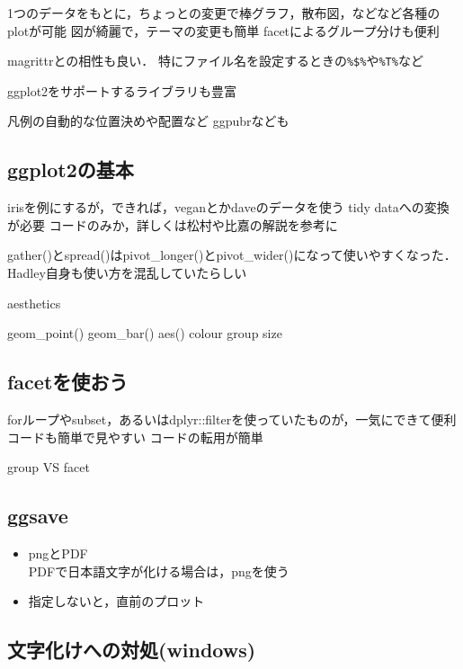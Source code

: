 \documentclass[
]{article}
\begin{document}
1つのデータをもとに，ちょっとの変更で棒グラフ，散布図，などなど各種のplotが可能
図が綺麗で，テーマの変更も簡単
facetによるグループ分けも便利

magrittrとの相性も良い．
特にファイル名を設定するときの\texttt{\%\$\%}や\texttt{\%T\%}など

ggplot2をサポートするライブラリも豊富

凡例の自動的な位置決めや配置など
ggpubrなども

\hypertarget{ggplot2ux306eux57faux672c}{%
\subsection{ggplot2の基本}\label{ggplot2ux306eux57faux672c}}

irisを例にするが，できれば，veganとかdaveのデータを使う
tidy dataへの変換が必要
コードのみか，詳しくは松村や比嘉の解説を参考に

gather()とspread()はpivot\_longer()とpivot\_wider()になって使いやすくなった．
Hadley自身も使い方を混乱していたらしい

aesthetics

geom\_point()
geom\_bar()
aes()
colour
group
size

\hypertarget{facetux3092ux4f7fux304aux3046}{%
\subsection{facetを使おう}\label{facetux3092ux4f7fux304aux3046}}

forループやsubset，あるいはdplyr::filterを使っていたものが，一気にできて便利
コードも簡単で見やすい
コードの転用が簡単

group VS facet

\hypertarget{ggsave}{%
\subsection{ggsave}\label{ggsave}}

\begin{itemize}
\item
  pngとPDF\\
  PDFで日本語文字が化ける場合は，pngを使う
\item
  指定しないと，直前のプロット
\end{itemize}

\hypertarget{ux6587ux5b57ux5316ux3051ux3078ux306eux5bfeux51e6windows}{%
\subsection{文字化けへの対処(windows)}\label{ux6587ux5b57ux5316ux3051ux3078ux306eux5bfeux51e6windows}}
\end{document}
